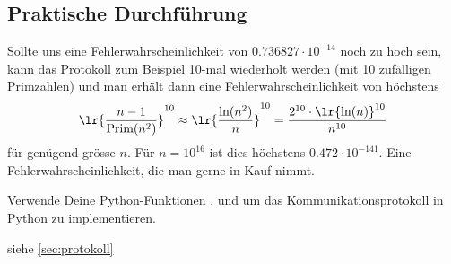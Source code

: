 \subsection{Praktische Durchführung}
Sollte uns eine Fehlerwahrscheinlichkeit von $0.736827\cdot 10^{-14}$ noch zu hoch sein, kann das Protokoll zum Beispiel 10-mal wiederholt werden (mit 10 zufälligen Primzahlen) und man erhält dann eine Fehlerwahrscheinlichkeit von höchstens
\begin{align*}
	\lr{\frac{n-1}{\text{Prim}(n^2)}}^{10}\approx \lr{\frac{\ln(n^2)}{n}}^{10} = \frac{2^{10}\cdot \lr{\ln(n)}^{10}}{n^{10}}
\end{align*}
für genügend grösse $n$. Für $n = 10^{16}$ ist dies höchstens $0.472\cdot 10^{-141}$. Eine Fehlerwahrscheinlichkeit, die man gerne in Kauf nimmt.
\begin{myexercise}\label{myexercise:protokoll}
	Verwende Deine Python-Funktionen ,  und  um das Kommunikationsprotokoll in Python zu implementieren.
	\begin{myanswer}
		siehe \cref{sec:protokoll}
	\end{myanswer}
\end{myexercise}
